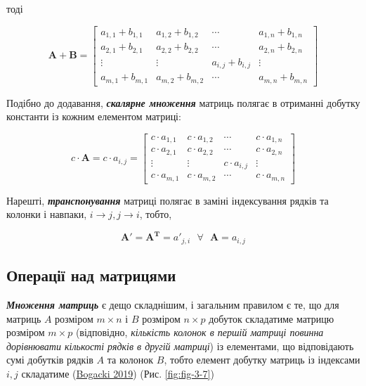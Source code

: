 \documentclass[
  11pt,
]{book}
\begin{document}
тоді

\[\mathbf{A} + \mathbf{B} = \begin{bmatrix}
a_{1, 1}+b_{1, 1} & a_{1,2}+b_{1,2} & \cdots & a_{1, n}+b_{1, n}\\
a_{2, 1}+b_{2, 1} & a_{2,2}+b_{2,2} & \cdots & a_{2, n}+b_{2, n}\\
\vdots & \vdots & a_{i,j}+b_{i,j} & \vdots \\
a_{m, 1}+b_{m, 1} & a_{m,2}+b_{m,2} & \cdots & a_{m, n}+b_{m, n}
\end{bmatrix}\]

Подібно до додавання, \textbf{\emph{скалярне множення}} матриць полягає в отриманні добутку константи із кожним елементом матриці:

\[c \cdot \mathbf{A} = c \cdot a_{i, j} = \begin{bmatrix}
c \cdot a_{1, 1} & c \cdot a_{1,2} & \cdots & c \cdot a_{1, n}\\
c \cdot a_{2, 1} & c \cdot  a_{2,2} & \cdots & c \cdot a_{2, n}\\
\vdots & \vdots & c \cdot a_{i,j} & \vdots \\
c \cdot a_{m, 1} & c \cdot a_{m,2} & \cdots & c \cdot a_{m, n}
\end{bmatrix}\]

Нарешті, \textbf{\emph{транспонування}} матриці полягає в заміні індексування рядків та колонки і навпаки, \(i \rightarrow j, j \rightarrow i\), тобто,

\[\mathbf{A'} = \mathbf{A^T} = a'_{j, i} \text{ } \forall \text{ } \mathbf{A} = a_{i, j}\]

\subsection{Операції над матрицями}\label{ux43eux43fux435ux440ux430ux446ux456ux457-ux43dux430ux434-ux43cux430ux442ux440ux438ux446ux44fux43cux438}

\textbf{\emph{Множення матриць}} є дещо складнішим, і загальним правилом є те, що для матриць \(A\) розміром \(m \times n\) і \(B\) розміром \(n \times p\) добуток складатиме матрицю розміром \(m \times p\) (відповідно, \emph{кількість колонок в першій матриці повинна дорівнювати кількості рядків в другій матриці}) із елементами, що відповідають сумі добутків рядків \(A\) та колонок \(B\), тобто елемент добутку матриць із індексами \(i, j\) складатиме (\href{https://books.google.com/books/about/Linear_Algebra.html?id=P8BZzAEACAAJ}{Bogacki 2019}) (Рис. \ref{fig:fig-3-7})
\end{document}
